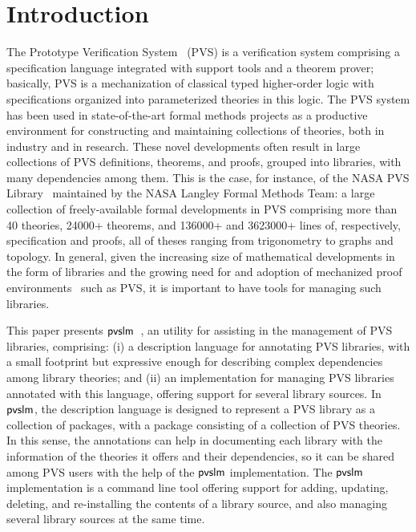 \section{Introduction}
\label{sec.intro}


The Prototype Verification System~\cite{pvs-cade92} (PVS) is a
verification system comprising a specification language integrated
with support tools and a theorem prover; basically, PVS is a
mechanization of classical typed higher-order logic with
specifications organized into parameterized theories in this logic.
The PVS system has been used in state-of-the-art formal methods
projects as a productive environment for constructing and maintaining
collections of theories, both in industry and in research. These novel
developments often result in large collections of PVS definitions,
theorems, and proofs, grouped into libraries, with many dependencies
among them. This is the case, for instance, of the NASA PVS
Library~\cite{nasalib} maintained by the NASA Langley Formal Methods
Team: a large collection of freely-available formal developments in
PVS comprising more than 40 theories, 24000+ theorems, and 136000+ and
3623000+ lines of, respectively, specification and proofs, all of
theses ranging from trigonometry to graphs and topology.  In general,
given the increasing size of mathematical developments in the form of
libraries and the growing need for and adoption of mechanized proof
environments~\cite{avigad-mech14,hales-proofs14} such as PVS, it is
important to have tools for managing such libraries.

This paper presents $\textsf{pvslm}$~\cite{pvslm}, an utility for assisting in
the management of PVS libraries, comprising: (i) a description
language for annotating PVS libraries, with a small footprint but
expressive enough for describing complex dependencies among library
theories; and (ii) an implementation for managing PVS libraries
annotated with this language, offering support for several library
sources. In $\textsf{pvslm}$, the description language is designed to
represent a PVS library as a collection of packages, with a package
consisting of a collection of PVS theories. In this sense, the
annotations can help in documenting each library with the information
of the theories it offers and their dependencies, so it can be shared
among PVS users with the help of the $\textsf{pvslm}$ implementation. The
$\textsf{pvslm}$ implementation is a command line tool offering support for
adding, updating, deleting, and re-installing the contents of a
library source, and also managing several library sources at the same
time.

